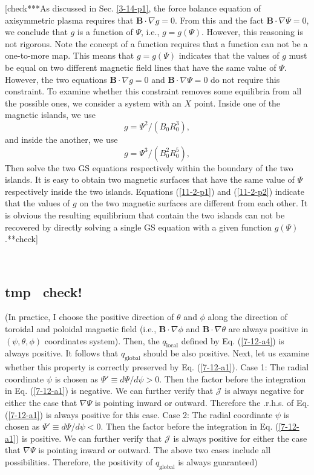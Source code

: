 \documentclass{llncs}
\newcommand{\tmop}[1]{\ensuremath{\operatorname{#1}}}
\begin{document}
[check***As discussed in Sec. \ref{3-14-p1}, the force balance equation of
axisymmetric plasma requires that $\mathbf{B} \cdot \nabla g = 0$. From this
and the fact $\mathbf{B} \cdot \nabla \Psi = 0$, we conclude that $g$ is a
function of $\Psi$, i.e., $g = g (\Psi)$. However, this reasoning is not
rigorous. Note the concept of a function requires that a function can not be a
one-to-more map. This means that $g = g (\Psi)$ indicates that the values of
$g$ must be equal on two different magnetic field lines that have the same
value of $\Psi$. However, the two equations $\mathbf{B} \cdot \nabla g = 0$
and $\mathbf{B} \cdot \nabla \Psi = 0$ do not require this constraint. To
examine whether this constraint removes some equilibria from all the possible
ones, we consider a system with an $X$ point. Inside one of the magnetic
islands, we use
\begin{equation}
  \label{11-2-p1} g = \Psi^2 / (B_0 R_0^3),
\end{equation}
and inside the another, we use
\begin{equation}
  \label{11-2-p2} g = \Psi^3 / (B_0^2 R_0^5),
\end{equation}
Then solve the two GS equations respectively within the boundary of the two
islands. It is easy to obtain two magnetic surfaces that have the same value
of $\Psi$ respectively inside the two islands. Equations (\ref{11-2-p1}) and
(\ref{11-2-p2}) indicate that the values of $g$ on the two magnetic surfaces
are different from each other. It is obvious the resulting equilibrium that
contain the two islands can not be recovered by directly solving a single GS
equation with a given function $g (\Psi)$.**check]

\

\subsection{tmp \ check!}

(In practice, I choose the positive direction of $\theta$ and $\phi$ along the
direction of toroidal and poloidal magnetic field (i.e., $\mathbf{B} \cdot
\nabla \phi$ and $\mathbf{B} \cdot \nabla \theta$ are always positive in
$(\psi, \theta, \phi)$ coordinates system). Then, the $q_{\tmop{local}}$
defined by Eq. (\ref{7-12-a4}) is always positive. It follows that
$q_{\tmop{global}}$ should be also positive. Next, let us examine whether this
property is correctly preserved by Eq. (\ref{7-12-a1}). Case 1: The radial
coordinate $\psi$ is chosen as $\Psi' \equiv d \Psi / d \psi > 0$. Then the
factor before the integration in Eq. (\ref{7-12-a1}) is negative. We can
further verify that $\mathcal{J}$ is always negative for either the case that
$\nabla \Psi$ is pointing inward or outward. Therefore the .r.h.s. of Eq.
(\ref{7-12-a1}) is always positive for this case. Case 2: The radial
coordinate $\psi$ is chosen as $\Psi' \equiv d \Psi / d \psi < 0$. Then the
factor before the integration in Eq. (\ref{7-12-a1}) is positive. We can
further verify that $\mathcal{J}$ is always positive for either the case that
$\nabla \Psi$ is pointing inward or outward. The above two cases include all
possibilities. Therefore, the positivity of $q_{\tmop{global}}$ is always
guaranteed)
\end{document}
